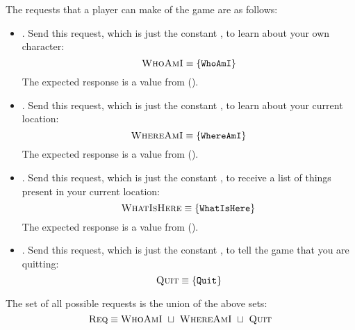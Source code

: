 The requests that a player can make of the game are as follows:
\begin{itemize}
\item \whoamireqset. Send this request, which is just the constant
  \whoamitg, to learn about your own character:
  \[ \textsc{WhoAmI} \equiv \{ \texttt{WhoAmI} \} \]
The expected response is a value from 
().
\item \whereamireqset. Send this request, which is just the constant
  \whereamitg, to learn about your current location:
  \[ \textsc{WhereAmI} \equiv \{ \texttt{WhereAmI} \} \]
The expected response is a value from 
().
\item \whatisherereqset. Send this request, which is just the constant
  \whatisheretg, to receive a list of things present in your current
  location:
  \[ \textsc{WhatIsHere} \equiv \{ \texttt{WhatIsHere} \} \]
The expected response is a value from 
().
\item \quitreqset. Send this request, which is just the constant
  \quittg, to tell the game that you are quitting:
  \[ \textsc{Quit} \equiv \{ \texttt{Quit} \} \]
\end{itemize}
The set of all possible requests is the union of the above sets:
\begin{equation}
  \textsc{Req} \equiv \textsc{WhoAmI} ~\sqcup~ \textsc{WhereAmI}
  ~\sqcup~ \textsc{Quit}
\end{equation}
